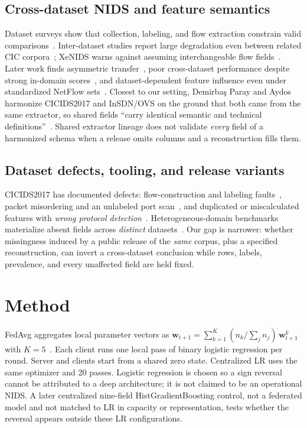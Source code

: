 \documentclass[conference,a4paper]{IEEEtran}
\begin{document}
\subsection{Cross-dataset NIDS and feature semantics}
Dataset surveys show that collection, labeling, and flow extraction constrain valid comparisons~\cite{ringsurvey}. Inter-dataset studies report large degradation even between related CIC corpora~\cite{dhooge}; XeNIDS warns against assuming interchangeable flow fields~\cite{xenids}. Later work finds asymmetric transfer~\cite{layeghy}, poor cross-dataset performance despite strong in-domain scores~\cite{cantone}, and dataset-dependent feature influence even under standardized NetFlow sets~\cite{sarhan}. Closest to our setting, Demirba\c{s} Paray and Aydos harmonize CICIDS2017 and InSDN/OVS on the ground that both came from the same extractor, so shared fields ``carry identical semantic and technical definitions''~\cite{smotefl}. Shared extractor lineage does not validate \emph{every} field of a harmonized schema when a release omits columns and a reconstruction fills them.

\subsection{Dataset defects, tooling, and release variants}
CICIDS2017 has documented defects: flow-construction and labeling faults~\cite{troubleshoot}, packet misordering and an unlabeled port scan~\cite{lanvin}, and duplicated or miscalculated features with \emph{wrong protocol detection}~\cite{rosay}. Heterogeneous-domain benchmarks materialize absent fields across \emph{distinct} datasets~\cite{hda}. Our gap is narrower: whether missingness induced by a public release of the \emph{same} corpus, plus a specified reconstruction, can invert a cross-dataset conclusion while rows, labels, prevalence, and every unaffected field are held fixed.

\section{Method}
FedAvg aggregates local parameter vectors as $\mathbf{w}_{t+1}=\sum_{k=1}^{K}(n_k/\sum_j n_j)\,\mathbf{w}^{k}_{t+1}$ with $K=5$~\cite{fedavg}. Each client runs one local pass of binary logistic regression per round. Server and clients start from a shared zero state. Centralized LR uses the same optimizer and 20 passes. Logistic regression is chosen so a sign reversal cannot be attributed to a deep architecture; it is not claimed to be an operational NIDS. A later centralized nine-field HistGradientBoosting control, not a federated model and not matched to LR in capacity or representation, tests whether the reversal appears outside these LR configurations.
\end{document}
